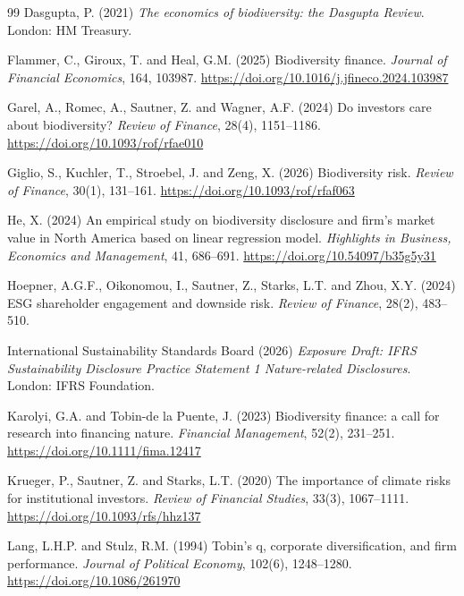 \documentclass[12pt,a4paper]{article}
\begin{document}
\begin{thebibliography}{99}
 Dasgupta, P. (2021) \emph{The economics of biodiversity: the Dasgupta Review}. London: HM Treasury.

 Flammer, C., Giroux, T. and Heal, G.M. (2025) Biodiversity finance. \emph{Journal of Financial Economics}, 164, 103987. \url{https://doi.org/10.1016/j.jfineco.2024.103987}

 Garel, A., Romec, A., Sautner, Z. and Wagner, A.F. (2024) Do investors care about biodiversity? \emph{Review of Finance}, 28(4), 1151--1186. \url{https://doi.org/10.1093/rof/rfae010}

 Giglio, S., Kuchler, T., Stroebel, J. and Zeng, X. (2026) Biodiversity risk. \emph{Review of Finance}, 30(1), 131--161. \url{https://doi.org/10.1093/rof/rfaf063}

 He, X. (2024) An empirical study on biodiversity disclosure and firm's market value in North America based on linear regression model. \emph{Highlights in Business, Economics and Management}, 41, 686--691. \url{https://doi.org/10.54097/b35g5y31}

 Hoepner, A.G.F., Oikonomou, I., Sautner, Z., Starks, L.T. and Zhou, X.Y. (2024) ESG shareholder engagement and downside risk. \emph{Review of Finance}, 28(2), 483--510.

 International Sustainability Standards Board (2026) \emph{Exposure Draft: IFRS Sustainability Disclosure Practice Statement 1 Nature-related Disclosures}. London: IFRS Foundation.

 Karolyi, G.A. and Tobin-de la Puente, J. (2023) Biodiversity finance: a call for research into financing nature. \emph{Financial Management}, 52(2), 231--251. \url{https://doi.org/10.1111/fima.12417}

 Krueger, P., Sautner, Z. and Starks, L.T. (2020) The importance of climate risks for institutional investors. \emph{Review of Financial Studies}, 33(3), 1067--1111. \url{https://doi.org/10.1093/rfs/hhz137}

 Lang, L.H.P. and Stulz, R.M. (1994) Tobin's q, corporate diversification, and firm performance. \emph{Journal of Political Economy}, 102(6), 1248--1280. \url{https://doi.org/10.1086/261970}


\end{thebibliography}
\end{document}
